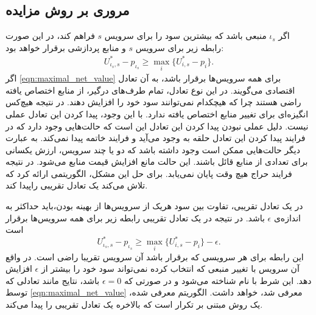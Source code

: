     \subsection{مروری بر روش مزایده}
      اگر $\iota_s$ منبعی باشد که بیشترین سود را برای سرویس $s$ فراهم کند، در این صورت رابطه زیر برای سرویس $s$ و منابع پردازشی برقرار خواهد بود:
      \begin{align}\label{eqn:maximal_net_value}
        U_{\iota_s,s}^* - p_{\iota_s} \ge \max_i \{U_{i,s}^* - p_i\}.
      \end{align}
      اگر \cref{eqn:maximal_net_value} برای همه سرویس‌ها برقرار باشد، به آن تعادل اقتصادی می‌گویند\cite{auction_algorithms_bertsekas}.
      در این نوع تعادل، تمام طرف‌های درگیر، از منابع اختصاص یافته راضی هستند چرا که هیچکدام نمی‌توانند سود خود را افزایش دهند.
      در نتیجه هیچ‌کس انگیزه‌ای برای تغییر منابع اختصاص یافته ندارد.
      با این وجود، پیدا کردن این تعادل عملی نیست.
      دلیل عملی نبودن پیدا کردن این تعادل این است که حالت‌هایی وجود دارد که در فرایند پیدا کردن این تعادل حلقه به وجود می‌آید و فرایند خاتمه پیدا نمی‌کند.
      به عبارت دیگر حالت‌هایی ممکن است وجود داشته باشد که دو یا چند سرویس، ارزش یکسانی برای تعدادی از منابع قائل باشند.
      این حالت مانع افزایش قیمت منابع می‌شود.
      در نتیجه فرایند حراج هیچ وقت پایان نمی‌یابد.
      برای حل این مشکل، \cite{auction_algorithms_bertsekas} الگوریتمی ارائه کرد که تلاش می‌کند یک تعادل تقریبی راپیدا کند.
      
      در یک تعادل تقریبی، تفاوت بین سود هریک از سرویس‌ها از بهینه بودن،باید حداکثر به اندازه‌ی $\epsilon$ باشد.
      در نتیجه در یک تعادل تقریبی رابطه زیر برای همه سرویس‌ها برقرار است
      \begin{equation}\label{eqn:almost_equilibrium}
        U_{\iota_s,s}^* - p_{\iota_s} \ge \max_i \{U_{i,s}^* - p_i\} - \epsilon.
      \end{equation}
      این رابطه برای هر سرویسی که برقرار باشد آن سرویس تقریبا راضی است.
      در واقع آن سرویس با تغییر منبعی که انتخاب کرده نمی‌تواند سود خود را بیشتر از $\epsilon$ افزایش دهد.
      این شرط با نام  شناخته می‌شود و در صورتی که $\epsilon = 0$ باشد، نتایج مانند تعادلی که توسط \cref{eqn:maximal_net_value} معرفی شد، خواهد داشت.
      الگوریتم معرفی شده، یک روش مبتنی بر تکرار است که بالاخره یک تعادل تقریبی را پیدا می‌کند.

